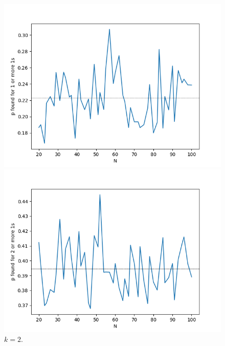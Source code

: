         \begin{figure}[!hbt]
            \centering
            \begin{minipage}{.33\linewidth}
              \centering
                \includegraphics[width = \textwidth]{./images/game2/0001_L_vs_p_MAX_L50-5100.png}
              \caption{$k = 1$.}
              \label{figure-k1}
            \end{minipage}
            \begin{minipage}{.33\linewidth}
              \centering
                \includegraphics[width = \textwidth]{./images/game2/0011_L_vs_p_MAX_L50-5100.png}
              \caption{$k = 2$.}
              \label{figure-k2}
            \end{minipage}      

\end{figure}
